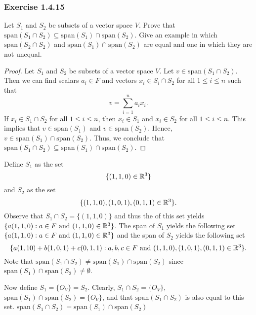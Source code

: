 \subsubsection{Exercise 1.4.15} Let \( S_{1}  \) and \( S_{2}  \) be subsets of a vector space \( V  \). Prove that \( \text{span}(S_{1} \cap S_{2}) \subseteq \text{span}(S_{1}) \cap \text{span}(S_{2})  \). Give an example in which \( \text{span}(S_{2} \cap S_{2} ) \) and \( \text{span}(S_{1} ) \cap \text{span}(S_{2}) \) are equal and one in which they are not unequal.
\begin{proof}
Let \( S_{1}  \) and \( S_{2}  \) be subsets of a vector space \( V  \). Let \( v \in \text{span}(S_{1} \cap S_{2} ) \). Then we can find scalars \( a_{i} \in F  \) and vectors \( x_{i} \in S_{i} \cap S_{2} \) for all \( 1 \leq i \leq  n \) such that 
\[ v = \sum_{ i=1 }^{ n } a_{i} x_{i}.  \]
If \( x_{i} \in S_{1} \cap S_{2}  \) for all \( 1 \leq i \leq n  \), then \( x_{i} \in S_{1}  \) and \( x_{i} \in S_{2} \) for all \( 1 \leq i \leq n \). This implies that \( v \in \text{span}(S_{1})    \) and \( v \in \text{span}(S_{2}) \). Hence, \( v  \in \text{span}(S_{1} ) \cap \text{span}(S_{2}) \). Thus, we conclude that \( \text{span}(S_{1} \cap S_{2}) \subseteq \text{span}(S_{1}) \cap \text{span}(S_{2}) \). 
\end{proof}
\begin{eg}
    Define \( S_{1}  \) as the set
    \[ \{  (1,1,0) \in \mathbb{R}^{3} \}   \] and \( S_{2} \) as the set 
    \[ \{ (1,1,0), (1,0,1), (0,1,1) \in  \mathbb{R}^{3} \}.   \]
    Observe that \( S_{1} \cap S_{2} = \{ (1,1,0) \}   \) and thus the of this set yields \( \{ a(1,1,0) : a \in F \ \text{and} \ (1,1,0) \in \mathbb{R}^{3} \}  \). The span of \( S_{1}  \) yields the following set \( \{ a(1,1,0) : a \in F \ \text{and} \ (1,1,0) \in \mathbb{R}^{3} \}  \) and the span of \( S_{2}   \) yields the following set
    \[ \{ a(1,10) + b(1,0,1) + c(0,1,1) : a,b,c \in F  \ \text{and} \ (1,1,0), (1,0,1),  (0,1,1) \in \mathbb{R}^{3} \}.  \] Note that \( \text{span}(S_{1} \cap S_{2}) \neq \text{span}(S_{1}) \cap \text{span}(S_{2})  \) since \( \text{span}(S_{1}) \cap \text{span}(S_{2}) \neq \emptyset \).

    Now define \( S_{1} = \{ O_{V} \} = S_{2}  \). Clearly, \( S_{1} \cap S_{2} = \{ O_{V} \}  \), \( \text{span}(S_{1} ) \cap \text{span}(S_{2}) = \{ O_{V} \}  \), and that \( \text{span}(S_{1} \cap S_{2}) \) is also equal to this set.  \( \text{span}(S_{1} \cap S_{2} ) = \text{span}(S_{1}) \cap \text{span}(S_{2})  \) 
\end{eg}

